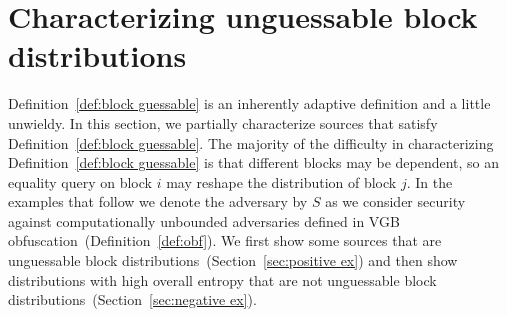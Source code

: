 \documentclass[11pt]{article}
\newcommand{\secref}[1]{\mbox{Section~\ref{#1}}}
\newcommand{\defref}[1]{\mbox{Definition~\ref{#1}}}
\newcommand{\class}[1]{{\ensuremath{\mathsf{#1}}}}
\newcommand{\gen}{\ensuremath{\class{Gen}}\xspace}
\newcommand{\rep}{\ensuremath{\class{Rep}}\xspace}
\newcommand{\Hoo}{\mathrm{H}_\infty}
\newcommand{\Hav}{\tilde{\mathrm{H}}_\infty}
\newtheorem{lemma}[theorem]{Lemma}
\begin{document}

\section{Characterizing unguessable block distributions}
\label{sec:characterize}

\defref{def:block guessable} is an inherently adaptive definition and a little unwieldy.  In this section, we partially characterize sources that satisfy \defref{def:block guessable}.
The majority of the difficulty in characterizing \defref{def:block guessable} is that different blocks may be dependent, so an equality query on block $i$ may reshape the distribution of block $j$.  In the examples that follow we denote the adversary by $S$ as we consider security against computationally unbounded adversaries defined in VGB obfuscation~(\defref{def:obf}).  We first show some sources that are unguessable block distributions~(\secref{sec:positive ex}) and then show distributions with high overall entropy that are not unguessable block distributions~(\secref{sec:negative ex}).
\end{document}
